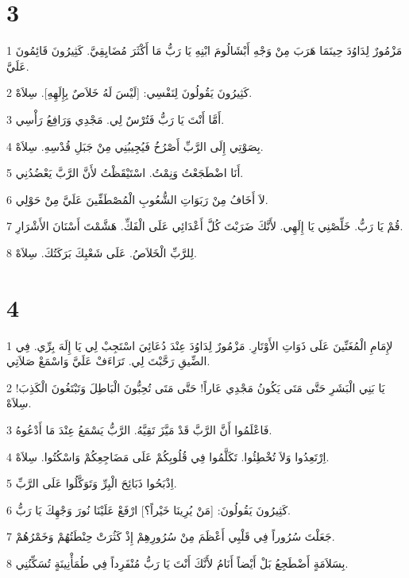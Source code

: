 \chapter{3}

\par 1 مَزْمُورٌ لِدَاوُدَ حِينَمَا هَرَبَ مِنْ وَجْهِ أَبْشَالُومَ ابْنِهِ يَا رَبُّ مَا أَكْثَرَ مُضَايِقِيَّ. كَثِيرُونَ قَائِمُونَ عَلَيَّ.
\par 2 كَثِيرُونَ يَقُولُونَ لِنَفْسِي: [لَيْسَ لَهُ خَلاَصٌ بِإِلَهِهِ]. سِلاَهْ.
\par 3 أَمَّا أَنْتَ يَا رَبُّ فَتُرْسٌ لِي. مَجْدِي وَرَافِعُ رَأْسِي.
\par 4 بِصَوْتِي إِلَى الرَّبِّ أَصْرُخُ فَيُجِيبُنِي مِنْ جَبَلِ قُدْسِهِ. سِلاَهْ.
\par 5 أَنَا اضْطَجَعْتُ وَنِمْتُ. اسْتَيْقَظْتُ لأَنَّ الرَّبَّ يَعْضُدُنِي.
\par 6 لاَ أَخَافُ مِنْ رَبَوَاتِ الشُّعُوبِ الْمُصْطَفِّينَ عَلَيَّ مِنْ حَوْلِي.
\par 7 قُمْ يَا رَبُّ. خَلِّصْنِي يَا إِلَهِي. لأَنَّكَ ضَرَبْتَ كُلَّ أَعْدَائِي عَلَى الْفَكِّ. هَشَّمْتَ أَسْنَانَ الأَشْرَارِ.
\par 8 لِلرَّبِّ الْخَلاَصُ. عَلَى شَعْبِكَ بَرَكَتُكَ. سِلاَهْ.

\chapter{4}

\par 1 لإِمَامِ الْمُغَنِّينَ عَلَى ذَوَاتِ الأَوْتَارِ. مَزْمُورٌ لِدَاوُدَ عِنْدَ دُعَائِيَ اسْتَجِبْ لِي يَا إِلَهَ بِرِّي. فِي الضِّيقِ رَحَّبْتَ لِي. تَرَاءَفْ عَلَيَّ وَاسْمَعْ صَلاَتِي.
\par 2 يَا بَنِي الْبَشَرِ حَتَّى مَتَى يَكُونُ مَجْدِي عَاراً! حَتَّى مَتَى تُحِبُّونَ الْبَاطِلَ وَتَبْتَغُونَ الْكَذِبَ! سِلاَهْ.
\par 3 فَاعْلَمُوا أَنَّ الرَّبَّ قَدْ مَيَّزَ تَقِيَّهُ. الرَّبُّ يَسْمَعُ عِنْدَ مَا أَدْعُوهُ.
\par 4 اِرْتَعِدُوا وَلاَ تُخْطِئُوا. تَكَلَّمُوا فِي قُلُوبِكُمْ عَلَى مَضَاجِعِكُمْ وَاسْكُتُوا. سِلاَهْ.
\par 5 اِذْبَحُوا ذَبَائِحَ الْبِرِّ وَتَوَكَّلُوا عَلَى الرَّبِّ.
\par 6 كَثِيرُونَ يَقُولُونَ: [مَنْ يُرِينَا خَيْراً؟] ارْفَعْ عَلَيْنَا نُورَ وَجْهِكَ يَا رَبُّ.
\par 7 جَعَلْتَ سُرُوراً فِي قَلْبِي أَعْظَمَ مِنْ سُرُورِهِمْ إِذْ كَثُرَتْ حِنْطَتُهُمْ وَخَمْرُهُمْ.
\par 8 بِسَلاَمَةٍ أَضْطَجِعُ بَلْ أَيْضاً أَنَامُ لأَنَّكَ أَنْتَ يَا رَبُّ مُنْفَرِداً فِي طُمَأْنِينَةٍ تُسَكِّنُنِي.


